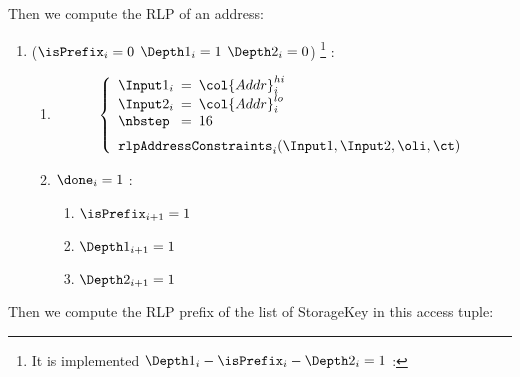 Then we compute the RLP of an address:
\begin{enumerate}[resume]
	\item \If ($\isPrefix_{i}=0$ \et $\Depth1_{i}=1$ \et $\Depth2_{i}=0$) \footnote{It is implemented \If  $\Depth1_{i} - \isPrefix_{i} - \Depth2_{i}=1$ \Then:} \Then:
	\begin{enumerate}
	\item
        \[
        \left\{
        \begin{array}{lcl}
            \Input1_{i} & \!\!\! = \!\!\! & \col{Addr}^{hi}_{i} \\
            \Input2_{i} & \!\!\! = \!\!\! & \col{Addr}^{lo}_{i} \\
            \nbstep & \!\!\! = \!\!\! & 16 \vspace{2mm} \\
            \multicolumn{3}{l}{\texttt{rlpAddressConstraints}_{i}(\Input1, \Input2, \oli, \ct)} \\
        \end{array}
        \right.
        \]
	 	\item \If $\done_{i}=1$ \Then:
	 	\begin{enumerate}
	 		\item $\isPrefix_{i+1}=1$
	 		\item $\Depth1_{i+1}=1$
	 		\item $\Depth2_{i+1}=1$
	 	\end{enumerate}
	\end{enumerate}
\end{enumerate}
Then we compute the RLP prefix of the list of StorageKey in this access tuple:
